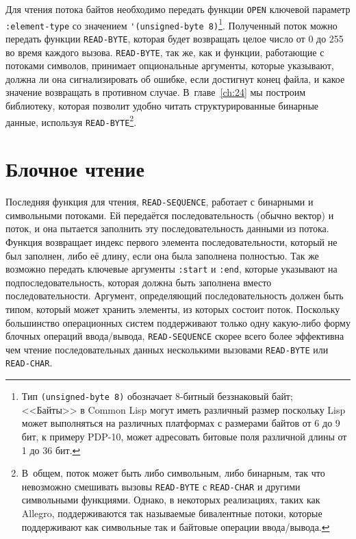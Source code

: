 Для чтения потока байтов необходимо передать функции \lstinline{OPEN} ключевой параметр
\lstinline{:element-type} со значением \lstinline{'(unsigned-byte 8)}\footnote{Тип
  \lstinline{(unsigned-byte 8)} обозначает 8-битный беззнаковый байт; <<Байты>> в Common Lisp
  могут иметь различный размер поскольку Lisp может выполняться на различных платформах с
  размерами байтов от 6 до 9 бит, к примеру PDP-10, может адресовать битовые поля
  различной длины от 1 до 36 бит.}\hspace{\footnotenegspace}. Полученный поток можно передать функции
\lstinline{READ-BYTE}, которая будет возвращать целое число от 0 до 255 во время каждого
вызова. \lstinline{READ-BYTE}, так же, как и функции, работающие с потоками символов, принимает
опциональные аргументы, которые указывают, должна ли она сигнализировать об ошибке, если
достигнут конец файла, и какое значение возвращать в противном случае. В~главе~\ref{ch:24}
мы построим библиотеку, которая позволит удобно читать структурированные бинарные данные,
используя \lstinline{READ-BYTE}\footnote{В~общем, поток может быть либо символьным, либо
  бинарным, так что невозможно смешивать вызовы \lstinline{READ-BYTE} с \lstinline{READ-CHAR} и
  другими символьными функциями. Однако, в некоторых реализациях, таких как Allegro,
  поддерживаются так называемые бивалентные потоки, которые поддерживают как символьные
так и байтовые операции ввода/вывода.}\hspace{\footnotenegspace}.

\section{Блочное чтение}

Последняя функция для чтения, \lstinline{READ-SEQUENCE}, работает с бинарными и символьными
потоками. Ей передаётся последовательность (обычно вектор) и поток, и она пытается
заполнить эту последовательность данными из потока. Функция возвращает индекс первого
элемента последовательности, который не был заполнен, либо её длину, если она была
заполнена полностью. Так же возможно передать ключевые аргументы \lstinline{:start} и
\lstinline{:end}, которые указывают на подпоследовательность, которая должна быть заполнена
вместо последовательности. Аргумент, определяющий последовательность должен быть типом,
который может хранить элементы, из которых состоит поток. Поскольку большинство
операционных систем поддерживают только одну какую-либо форму блочных операций
ввода/вывода, \lstinline{READ-SEQUENCE} скорее всего более эффективна чем чтение
последовательных данных несколькими вызовами \lstinline{READ-BYTE} или \lstinline{READ-CHAR}.

